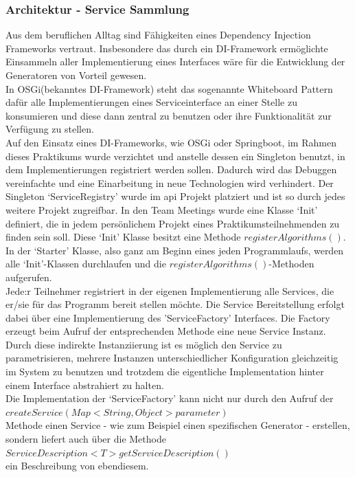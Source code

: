 \documentclass[../mciAusarbeitung.tex]{subfiles}
\begin{document}
	\subsubsection{Architektur - Service Sammlung}
	Aus dem beruflichen Alltag sind Fähigkeiten eines Dependency Injection Frameworks vertraut. Insbesondere das durch ein DI-Framework ermöglichte Einsammeln aller Implementierung eines Interfaces wäre für die Entwicklung der Generatoren von Vorteil gewesen.\\ 
	In OSGi(bekanntes DI-Framework) steht das sogenannte Whiteboard Pattern \cite{OsgiAlliance} dafür alle Implementierungen eines Serviceinterface an einer Stelle zu konsumieren und diese dann zentral zu benutzen oder ihre Funktionalität zur Verfügung zu stellen.\\
Auf den Einsatz eines DI-Frameworks, wie OSGi oder Springboot, im Rahmen dieses Praktikums wurde verzichtet und anstelle dessen ein Singleton benutzt, in dem Implementierungen registriert werden sollen. Dadurch wird das Debuggen vereinfachte und eine Einarbeitung in neue Technologien wird verhindert. Der Singleton `ServiceRegistry' wurde im api Projekt platziert und ist so durch jedes weitere Projekt zugreifbar. 
In den Team Meetings wurde eine Klasse `Init' definiert, die in jedem persönlichem Projekt eines Praktikumsteilnehmenden zu finden sein soll. Diese `Init' Klasse besitzt eine Methode $registerAlgorithms()$. In der `Starter' Klasse, also ganz am Beginn eines jeden Programmlaufs, werden alle `Init'-Klassen durchlaufen und die $registerAlgorithms()$-Methoden aufgerufen. \\
Jede:r Teilnehmer registriert in der eigenen Implementierung alle Services, die er/sie für das Programm bereit stellen möchte. Die Service Bereitstellung erfolgt dabei über eine Implementierung des 'ServiceFactory' Interfaces. Die Factory erzeugt beim Aufruf der entsprechenden Methode eine neue Service Instanz. Durch diese indirekte Instanziierung ist es möglich den Service zu parametrisieren, mehrere Instanzen unterschiedlicher Konfiguration gleichzeitig im System zu benutzen und trotzdem die eigentliche Implementation hinter einem Interface abstrahiert zu halten.\\
Die Implementation der `ServiceFactory' kann nicht nur durch den Aufruf der 
	\\\indent $createService(Map<String, Object> parameter)$ \\
Methode einen Service - wie zum Beispiel einen spezifischen Generator - erstellen, sondern liefert auch über die Methode \\\indent $ServiceDescription<T> getServiceDescription()$\\ ein Beschreibung von ebendiesem.\\
\end{document}
